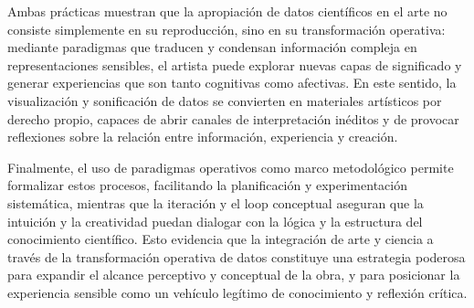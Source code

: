 \documentclass[spanish]{report}
\begin{document}
Ambas prácticas muestran que la apropiación de datos científicos en el arte no consiste simplemente en su reproducción, sino en su transformación operativa: mediante paradigmas que traducen y condensan información compleja en representaciones sensibles, el artista puede explorar nuevas capas de significado y generar experiencias que son tanto cognitivas como afectivas. En este sentido, la visualización y sonificación de datos se convierten en materiales artísticos por derecho propio, capaces de abrir canales de interpretación inéditos y de provocar reflexiones sobre la relación entre información, experiencia y creación.

Finalmente, el uso de paradigmas operativos como marco metodológico permite formalizar estos procesos, facilitando la planificación y experimentación sistemática, mientras que la iteración y el loop conceptual aseguran que la intuición y la creatividad puedan dialogar con la lógica y la estructura del conocimiento científico. Esto evidencia que la integración de arte y ciencia a través de la transformación operativa de datos constituye una estrategia poderosa para expandir el alcance perceptivo y conceptual de la obra, y para posicionar la experiencia sensible como un vehículo legítimo de conocimiento y reflexión crítica.
\end{document}
